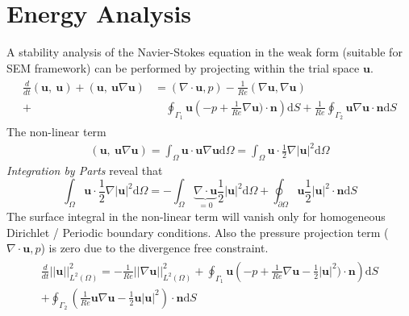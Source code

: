 \section{Energy Analysis}
A stability analysis of the Navier-Stokes equation in the weak form (suitable for SEM framework) can be performed by projecting within the trial space $\pmb{u}$.
\begin{align}
\begin{split}
\frac{d}{dt}\left(\pmb{u},\ \pmb{u}\right) + \left(\pmb{u} , \ \pmb{u}\nabla \pmb{u}\right) & = \left(\nabla \cdot \pmb{u} , p\right) - \frac{1}{Re}\left(\nabla  \pmb{u} , \nabla\pmb{u}\right) \\ 
 + &\quad \oint_{\Gamma_1}\pmb{u} \left(-p + \frac{1}{Re}\nabla \pmb{u})\cdot \pmb{n}\right)\mbox{d}S + \frac{1}{Re}\oint_{\Gamma_2}\pmb{u} \nabla \pmb{u}\cdot \pmb{n}\mbox{d}S \label{eneq}
\end{split}
\end{align}
The non-linear term
\begin{align}
\left(\pmb{u} , \ \pmb{u}\nabla \pmb{u}\right)  =  \int_{\Omega}\pmb{u} \cdot \pmb{u}\nabla \pmb{u}\mbox{d}\Omega = \int_{\Omega}\pmb{u} \cdot \frac{1}{2}\nabla \vert\pmb{u}\vert^{2}\mbox{d}\Omega
\end{align}
\textit{Integration by Parts} reveal that 
\begin{equation}
\int_{\Omega}\pmb{u} \cdot \frac{1}{2}\nabla \vert\pmb{u}\vert^{2}\mbox{d}\Omega = -\int_{\Omega}\underbrace{\nabla \cdot \pmb{u}}_{= 0}  \frac{1}{2} \vert\pmb{u}\vert^{2}\mbox{d}\Omega + \oint_{\partial \Omega} \pmb{u}\frac{1}{2} \vert\pmb{u}\vert^{2}\cdot \pmb{n}\mbox{d}S
\end{equation}
The surface integral in the non-linear term will vanish only for homogeneous Dirichlet / Periodic boundary conditions. Also the pressure projection term ($\nabla \cdot \pmb{u}, p$) is zero due to the divergence free constraint.
\begin{align}
\begin{split}
\frac{d}{dt}\vert\vert \pmb{u} \vert\vert^2_{L^{2}(\Omega)} = -\frac{1}{Re}\vert\vert\nabla \pmb{u}\vert\vert^2_{L^{2}(\Omega)} 
+ \oint_{\Gamma_1}\pmb{u} \left(-p + \frac{1}{Re}\nabla \pmb{u} - \frac{1}{2}\vert \pmb{u}\vert^2)\cdot \pmb{n}\right)\mbox{d}S \\
+  \oint_{\Gamma_2}(\frac{1}{Re} \pmb{u} \nabla \pmb{u} - \frac{1}{2}\pmb{u}\vert  \pmb{u}\vert^2)\cdot \pmb{n}\mbox{d}S \label{out}
\end{split}
\end{align}
